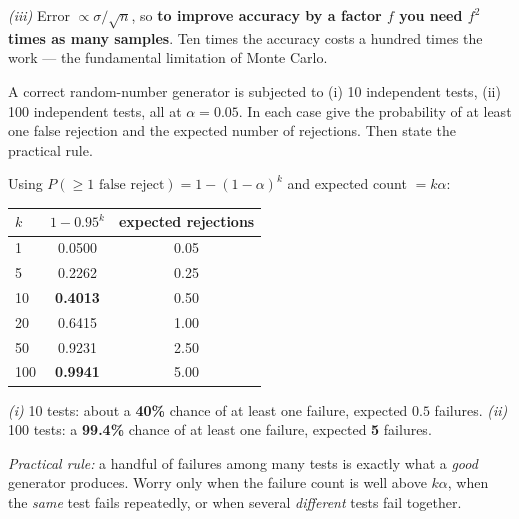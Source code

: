 \begin{probbox}
\emph{(iii)} Error $\propto \sigma/\sqrt n$, so \textbf{to improve accuracy by a factor $f$ you need $f^2$ times as many samples}. Ten times the accuracy costs a hundred times the work --- the fundamental limitation of Monte Carlo.

 A correct random-number generator is subjected to (i) 10 independent tests, (ii) 100 independent tests, all at $\alpha = 0.05$. In each case give the probability of at least one false rejection and the expected number of rejections. Then state the practical rule.

\ans Using $P(\ge1\text{ false reject}) = 1-(1-\alpha)^k$ and expected count $= k\alpha$:
\begin{center}\small
\begin{tabular}{@{}lcc@{}}
\toprule
$k$ & $1-0.95^k$ & expected rejections\\
\midrule
1 & 0.0500 & 0.05\\
5 & 0.2262 & 0.25\\
10 & \textbf{0.4013} & 0.50\\
20 & 0.6415 & 1.00\\
50 & 0.9231 & 2.50\\
100 & \textbf{0.9941} & 5.00\\
\bottomrule
\end{tabular}
\end{center}
\emph{(i)} 10 tests: about a \textbf{40\%} chance of at least one failure, expected $0.5$ failures.
\emph{(ii)} 100 tests: a \textbf{99.4\%} chance of at least one failure, expected \textbf{5} failures.

\emph{Practical rule:} a handful of failures among many tests is exactly what a \emph{good} generator produces. Worry only when the failure count is well above $k\alpha$, when the \emph{same} test fails repeatedly, or when several \emph{different} tests fail together.
\end{probbox}

